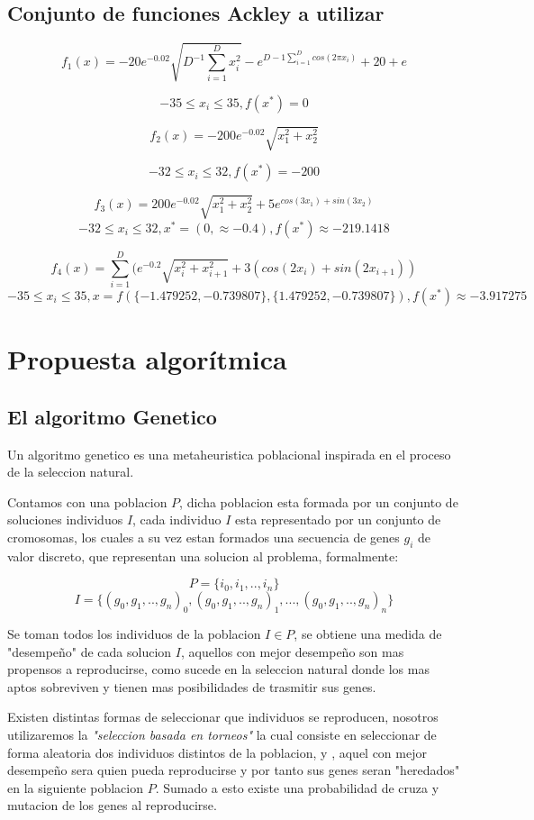 \documentclass[10pt]{article}
\begin{document}
\subsection{Conjunto de funciones Ackley a utilizar}
 
$$f_1(x) = -20e^{-0.02}\sqrt{D^{-1}\sum_{i=1}^{D}x_{i}^2}-e^{D-1\sum_{i=1}^{D}cos(2\pi x_i)}+20+e$$

$$-35\leq x_i \leq 35, f(x^*) = 0$$

$$f_2(x) = -200e^{-0.02}\sqrt{x_1^2+x_2^2}$$

$$-32\leq x_i \leq 32, f(x^*) = -200$$

$$f_3(x) = 200e^{-0.02}\sqrt{x_1^2+x_2^2}+5e^{cos(3x_1)+sin(3x_2)}$$
$$-32\leq x_i \leq 32, x^* = (0, \approx -0.4), f(x^*) \approx -219.1418$$

$$f_4(x) = \sum_{i=1}^{D}(e^{-0.2}\sqrt{x_i^2+x_{i+1}^2}+3(cos(2x_i)+sin(2x_{i+1}))$$
$$-35\leq x_i \leq 35, x=f(\{-1.479252,-0.739807\},\{1.479252,-0.739807\}), f(x^*) \approx -3.917275$$ 

\section{Propuesta algorítmica} %

\subsection{El algoritmo Genetico}

Un algoritmo genetico es una metaheuristica poblacional inspirada en el proceso de la seleccion natural.

Contamos con una poblacion $P$, dicha poblacion esta formada por un conjunto de soluciones individuos $I$, cada individuo $I$ esta representado por un conjunto de cromosomas, los cuales a su vez estan formados una secuencia de genes $g_i$ de valor discreto, que representan una solucion al problema, formalmente:

$$P =\{i_0,i_1,..,i_n\}$$
$$I =\{(g_0,g_1,..,g_n)_0,(g_0,g_1,..,g_n)_1,...,(g_0,g_1,..,g_n)_n\}$$

Se toman todos los individuos de la poblacion $I \in P$, se obtiene una medida de "desempeño" de cada solucion $I$, aquellos con mejor desempeño son mas propensos a reproducirse, como sucede en la seleccion natural donde los mas aptos sobreviven y tienen mas posibilidades de trasmitir sus genes.

Existen distintas formas de seleccionar que individuos se reproducen, nosotros utilizaremos la \textit{"seleccion basada en torneos"} la cual consiste en seleccionar de forma aleatoria dos individuos distintos de la poblacion, y , aquel con mejor desempeño sera quien pueda reproducirse y por tanto sus genes seran "heredados" en la siguiente poblacion $P$. Sumado a esto existe una probabilidad de cruza y mutacion de los genes al reproducirse.
\end{document}
